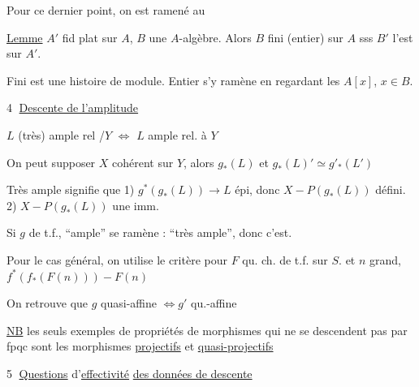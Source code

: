 
Pour ce dernier point, on est ramené au

\uline{Lemme} $A'$ fid plat sur $A$, $B$ une $A$-algèbre. Alors $B$ fini (entier) sur $A$ sss $B'$ l'est sur $A'$.

Fini est une histoire de module. Entier s'y ramène en regardant les $A[x]$, $x\in B$.

\textcircled{4} \uline{Descente de l'amplitude}


\uline{$L$} (très) ample rel /$Y$ $\Longleftrightarrow$ $L$  ample rel. à $Y$

On peut supposer $X$ cohérent sur $Y$, alors $g_*(L)$  et $g_*(L)'\simeq g'_*(L')$

Très ample signifie que 1) $g^*(g_*(L))\longrightarrow L$ épi, donc $X\mathrel{-}P(g_*(L))$ défini.  2)  $X\mathrel{-}P(g_*(L))$ une imm.

Si $g$ de t.f., ``ample'' se ramène : ``très ample'', donc c'est.

Pour le cas général,  on utilise le critère  pour $F$ qu. ch. de t.f. sur $S$. et $n$ grand, $f^*(f_*(F(n)))\mathrel{-}F(n)$ 

On retrouve que $g$ quasi-affine $\Longleftrightarrow g'$ qu.-affine

\uline{NB} les seuls exemples de propriétés de morphismes qui ne se descendent pas par fpqc sont les morphismes \uline{projectifs} et \uline{quasi-projectifs}

\textcircled{5} \uline{Questions} d'\uline{effectivité} \uline{des données de descente}

